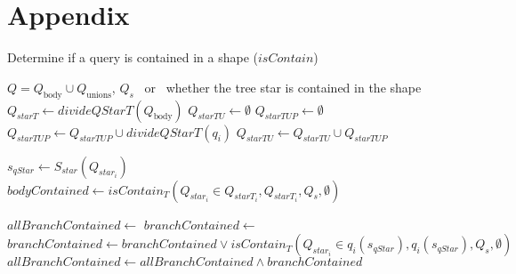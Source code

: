 \section*{Appendix}\label{sec:appendix}

\begin{algorithm}
   \caption{Determine if a query is contained in a shape ($isContain$)}\label{alg:containment}
   \begin{algorithmic}
     \REQUIRE  $Q = Q_{\text{body}} \cup Q_{\text{unions}}$, $Q_s$
     \ENSURE \TRUE\ or \FALSE\ whether the tree star is contained in the shape
        \STATE $Q_{starT} \gets divideQStarT(Q_{\text{body}})$
        \STATE $Q_{starTU} \gets \emptyset$
           \STATE $Q_{starTUP} \gets \emptyset$
              \STATE $Q_{starTUP} \gets Q_{starTUP} \cup divideQStarT(q_i) $
           \ENDFOR
           \STATE $Q_{starTU} \gets Q_{starTU} \cup Q_{starTUP}$
        \ENDFOR

           \STATE $s_{qStar} \gets S_{star}(Q_{star_i})$
           \STATE $bodyContained \gets isContain_{T}(Q_{star_i} \in Q_{starT_i}, Q_{starT_i}, Q_s, \emptyset )$
           
           \STATE $allBranchContained \gets $ \TRUE
                 \STATE $branchContained \gets $ \FALSE
                    \STATE $branchContained \gets branchContained \lor isContain_{T}(Q_{star_i} \in q_i(s_{qStar}), q_i(s_{qStar}), Q_s, \emptyset )$
                 \ENDIF
                 \STATE $allBranchContained \gets allBranchContained \land branchContained$
              \ENDFOR
           \ENDFOR
              \RETURN \TRUE
           \ENDIF
        \ENDFOR
     \RETURN \FALSE
   \end{algorithmic}
\end{algorithm}





\iffalse

\fi



\iffalse
$divideQStarT$ is a function that divides a query into a set of mapping.
The subject of the $Q_star \in Q_starT_i$ are the keys and the associated tree star pattern are the values.
\fi

\FloatBarrier